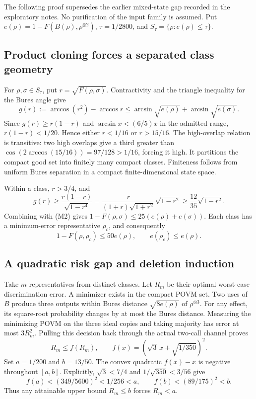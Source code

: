 \documentclass[11pt]{article}
\begin{document}
The following proof supersedes the earlier mixed-state gap recorded in the exploratory notes. No purification of the input family is assumed. Put $e(\rho)=1-F(B(\rho),\rho^{\otimes2})$, $\tau=1/2800$, and $S_\tau=\{\rho:e(\rho)\le\tau\}$.

\subsection{Product cloning forces a separated class geometry}

For $\rho,\sigma\in S_\tau$, put $r=\sqrt{F(\rho,\sigma)}$. Contractivity and the triangle inequality for the Bures angle give
\[
g(r):=\arccos(r^2)-\arccos r
\le\arcsin\sqrt{e(\rho)}+\arcsin\sqrt{e(\sigma)}.
\tag{M2}
\]
Since $g(r)\ge r(1-r)$ and $\arcsin x<(6/5)x$ in the admitted range, $r(1-r)<1/20$. Hence either $r<1/16$ or $r>15/16$. The high-overlap relation is transitive: two high overlaps give a third greater than $\cos(2\arccos(15/16))=97/128>1/16$, forcing it high. It partitions the compact good set into finitely many compact classes. Finiteness follows from uniform Bures separation in a compact finite-dimensional state space.

Within a class, $r>3/4$, and
\[
g(r)\ge\frac{r(1-r)}{\sqrt{1-r^4}}
=\frac{r}{(1+r)\sqrt{1+r^2}}\sqrt{1-r^2}
\ge\frac{12}{35}\sqrt{1-r^2}.
\]
Combining with (M2) gives $1-F(\rho,\sigma)\le25(e(\rho)+e(\sigma))$. Each class has a minimum-error representative $\rho_c$, and consequently
\[
1-F(\rho,\rho_c)\le50e(\rho),\qquad e(\rho_c)\le e(\rho).
\tag{M3}
\]

\subsection{A quadratic risk gap and deletion induction}

Take $m$ representatives from distinct classes. Let $R_m$ be their optimal worst-case discrimination error. A minimizer exists in the compact POVM set. Two uses of $B$ produce three outputs within Bures distance $\sqrt{8e(\rho)}$ of $\rho^{\otimes3}$. For any effect, its square-root probability changes by at most the Bures distance. Measuring the minimizing POVM on the three ideal copies and taking majority has error at most $3R_m^2$. Pulling this decision back through the actual two-call channel proves
\[
R_m\le f(R_m),\qquad f(x)=(\sqrt3\,x+\sqrt{1/350})^2.
\tag{M4}
\]
Set $a=1/200$ and $b=13/50$. The convex quadratic $f(x)-x$ is negative throughout $[a,b]$. Explicitly, $\sqrt3<7/4$ and $1/\sqrt{350}<3/56$ give
\[
f(a)<(349/5600)^2<1/256<a,\qquad
f(b)<(89/175)^2<b.
\]
Thus any attainable upper bound $R_m\le b$ forces $R_m<a$.
\end{document}
